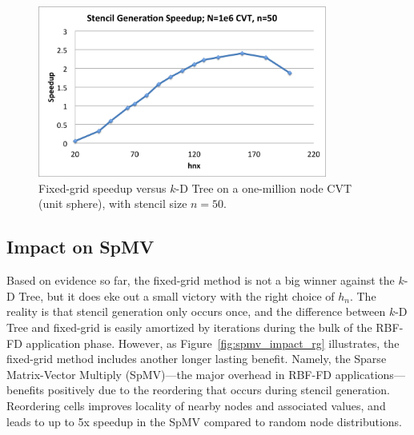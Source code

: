 \documentclass{report}
\begin{document}


\begin{figure}
\centering
\includegraphics[width=9.5cm]{../figures/stencils/cvt1m_stencil_gen_speedup.png}
\caption{Fixed-grid speedup versus $k$-D Tree on a one-million node CVT (unit sphere), with stencil size $n=50$.}
\label{fig:cvt_hn_speedup}
\end{figure}

\subsection{Impact on SpMV}

Based on evidence so far, the fixed-grid method is not a big winner against the $k$-D Tree, but it does eke out a small victory with the right choice of $h_n$. The reality is that stencil generation only occurs once, and the difference between $k$-D Tree and fixed-grid is easily amortized by iterations during the bulk of the RBF-FD application phase. However, as Figure~\ref{fig:spmv_impact_rg} illustrates, the fixed-grid method includes another longer lasting benefit. Namely, the Sparse Matrix-Vector Multiply (SpMV)---the major overhead in RBF-FD applications---benefits positively due to the reordering that occurs during stencil generation. Reordering cells improves locality of nearby nodes and associated values, and leads to up to 5x speedup in the SpMV compared to random node distributions. 
\end{document}
